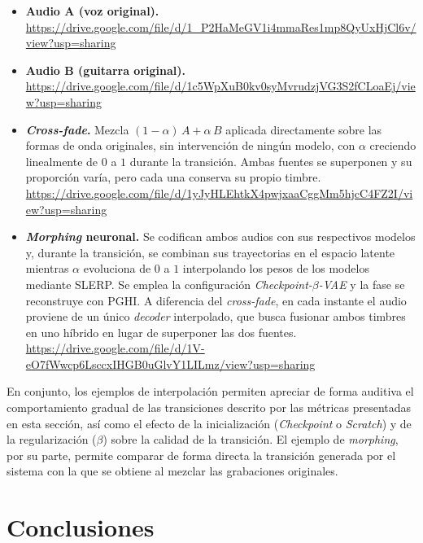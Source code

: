 \documentclass[12pt,a4paper,twoside]{tesis}
\begin{document}
\begin{itemize}
    \item \textbf{Audio A (voz original).}\\
    \url{https://drive.google.com/file/d/1_P2HaMeGV1i4mmaRes1mp8QyUxHjCl6v/view?usp=sharing}

    \item \textbf{Audio B (guitarra original).}\\
    \url{https://drive.google.com/file/d/1c5WpXuB0kv0syMvrudzjVG3S2fCLoaEj/view?usp=sharing}

    \item \textbf{\textit{Cross-fade}.} Mezcla $(1-\alpha)\,A + \alpha\,B$ aplicada directamente sobre las formas de onda originales, sin intervención de ningún modelo, con $\alpha$ creciendo linealmente de $0$ a $1$ durante la transición. Ambas fuentes se superponen y su proporción varía, pero cada una conserva su propio timbre.\\
    \url{https://drive.google.com/file/d/1yJyHLEhtkX4pwjxaaCggMm5hjcC4FZ2I/view?usp=sharing}

    \item \textbf{\emph{Morphing} neuronal.} Se codifican ambos audios con sus respectivos modelos y, durante la transición, se combinan sus trayectorias en el espacio latente mientras $\alpha$ evoluciona de $0$ a $1$ interpolando los pesos de los modelos mediante SLERP. Se emplea la configuración \textit{Checkpoint-$\beta$-VAE} y la fase se reconstruye con PGHI. A diferencia del \textit{cross-fade}, en cada instante el audio proviene de un único \textit{decoder} interpolado, que busca fusionar ambos timbres en uno híbrido en lugar de superponer las dos fuentes.\\
    \url{https://drive.google.com/file/d/1V-eO7fWwcp6LsccxIHGB0uGlvY1LILmz/view?usp=sharing}
\end{itemize}

En conjunto, los ejemplos de interpolación permiten apreciar de forma auditiva el comportamiento gradual de las transiciones descrito por las métricas presentadas en esta sección, así como el efecto de la inicialización (\textit{Checkpoint} o \textit{Scratch}) y de la regularización ($\beta$) sobre la calidad de la transición. El ejemplo de \emph{morphing}, por su parte, permite comparar de forma directa la transición generada por el sistema con la que se obtiene al mezclar las grabaciones originales.

\chapter{Conclusiones}
\label{cap:conclusiones}
\end{document}
